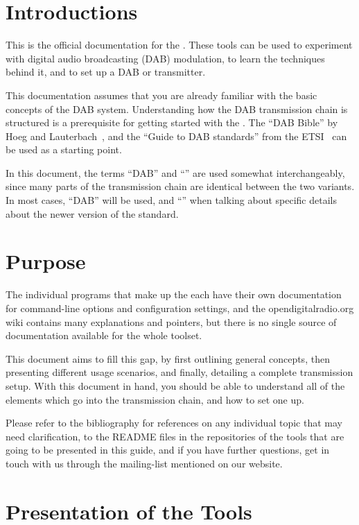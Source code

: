 \section{Introductions}
This is the official documentation for the \mmbtools. These tools can be used to
experiment with digital audio broadcasting (DAB) modulation, to learn the
techniques behind it, and to set up a DAB or \dabplus transmitter.

This documentation assumes that you are already familiar with the basic concepts
of the DAB system. Understanding how the DAB transmission chain is structured is
a prerequisite for getting started with the \mmbtools. The ``DAB Bible'' by Hoeg
and Lauterbach~\cite{hoeg}, and the ``Guide to DAB standards'' from the
ETSI~\cite{etsidabguide} can be used as a starting point.

In this document, the terms ``DAB'' and ``\dabplus'' are used somewhat
interchangeably, since many parts of the transmission chain are identical
between the two variants. In most cases, ``DAB'' will be used, and ``\dabplus''
when talking about specific details about the newer version of the standard.


\section{Purpose}
The individual programs that make up the \mmbtools each have their own
documentation for command-line options and configuration settings, and the
opendigitalradio.org wiki contains many
explanations and pointers, but there is no single source of documentation
available for the whole toolset.

This document aims to fill this gap, by first outlining general concepts, then
presenting different usage scenarios, and finally, detailing a complete
transmission setup.
With this document in hand, you should be able to understand all of the elements
which go into the \mmbtools transmission chain, and how to set one up.

Please refer to the bibliography for references on any individual topic that may need
clarification, to the README files in the repositories of the tools that are
going to be presented in this guide, and if you have further questions, get in
touch with us through the mailing-list mentioned on our website.

\section{Presentation of the Tools}
